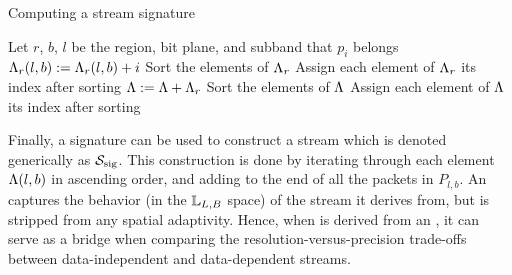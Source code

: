 \begin{algorithm}[h]
  \caption{Computing a stream signature}
  \begin{algorithmic}[1]
			\State Let $r$, $b$, $l$ be the region, bit plane, and subband that $p_i$ belongs
			\State $\sgn_r(l,b) := \sgn_r(l,b)+i$
		\EndFor
			\State Sort the elements of $\sgn_r$
			\State Assign each element of $\sgn_r$ its index after sorting
			\State $\sgn := \sgn+\sgn_r$
		\EndFor
		\State Sort the elements of $\sgn$
		\State Assign each element of $\sgn$ its index after sorting
	\end{algorithmic}
	\label{alg:signature}
\end{algorithm}

Finally, a signature can be used to construct a stream which is denoted generically as $\ssig$. This
construction is done by iterating through each element $\sgn(l,b)$ in ascending order, and adding to
the end of \ssig all the packets in $P_{l,b}$. An \ssig captures the behavior (in the ${\mathbb L}_{L,B}$
space) of the stream it derives from, but is stripped from any spatial adaptivity. Hence, when \ssig
is derived from an \sopt, it can serve as a bridge when comparing the resolution-versus-precision
trade-offs between data-independent and data-dependent streams.
